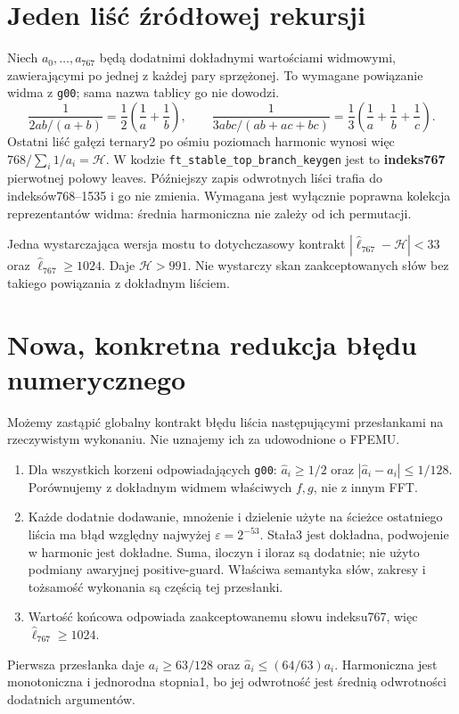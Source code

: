 \documentclass[11pt,a4paper]{article}
\newcommand{\code}[1]{\nolinkurl{#1}}
\newcommand{\HH}{\mathcal H}\newtheorem{theorem}{Twierdzenie}
\begin{document}
\section{Jeden liść źródłowej rekursji}
Niech $a_0,\ldots,a_{767}$ będą dodatnimi dokładnymi wartościami widmowymi,
zawierającymi po jednej z każdej pary sprzężonej. To wymagane powiązanie
widma z \code{g00}; sama nazwa tablicy go nie dowodzi.
\[
 \frac1{2ab/(a+b)}=\frac12\left(\frac1a+\frac1b\right),\qquad
 \frac1{3abc/(ab+ac+bc)}=\frac13\left(\frac1a+\frac1b+\frac1c\right).
\]
Ostatni liść gałęzi ternary2 po ośmiu poziomach harmonic wynosi więc
$768/\sum_i1/a_i=\HH$. W kodzie \code{ft_stable_top_branch_keygen}
jest to \textbf{indeks767} pierwotnej połowy leaves. Późniejszy zapis
odwrotnych liści trafia do indeksów768--1535 i go nie zmienia.
Wymagana jest wyłącznie poprawna kolekcja reprezentantów widma:
średnia harmoniczna nie zależy od ich permutacji.

Jedna wystarczająca wersja mostu to dotychczasowy kontrakt
$|\widehat\ell_{767}-\HH|<33$ oraz $\widehat\ell_{767}\ge1024$.
Daje $\HH>991$. Nie wystarczy skan zaakceptowanych słów bez takiego
powiązania z dokładnym liściem.

\section{Nowa, konkretna redukcja błędu numerycznego}
Możemy zastąpić globalny kontrakt błędu liścia następującymi przesłankami
na rzeczywistym wykonaniu. Nie uznajemy ich za udowodnione o FPEMU.
\begin{enumerate}
\item Dla wszystkich korzeni odpowiadających \code{g00}:
$\widehat a_i\ge1/2$ oraz $|\widehat a_i-a_i|\le1/128$.
Porównujemy z dokładnym widmem właściwych $f,g$, nie z innym FFT.
\item Każde dodatnie dodawanie, mnożenie i dzielenie użyte na ścieżce
ostatniego liścia ma błąd względny najwyżej $\varepsilon=2^{-53}$.
Stała3 jest dokładna, podwojenie w harmonic jest dokładne. Suma, iloczyn
i iloraz są dodatnie; nie użyto podmiany awaryjnej positive-guard.
Właściwa semantyka słów, zakresy i tożsamość wykonania są częścią tej przesłanki.
\item Wartość końcowa odpowiada zaakceptowanemu słowu indeksu767,
więc $\widehat\ell_{767}\ge1024$.
\end{enumerate}

Pierwsza przesłanka daje $a_i\ge63/128$ oraz
$\widehat a_i\le(64/63)a_i$.
Harmoniczna jest monotoniczna i jednorodna stopnia1, bo jej odwrotność
jest średnią odwrotności dodatnich argumentów.
\end{document}

